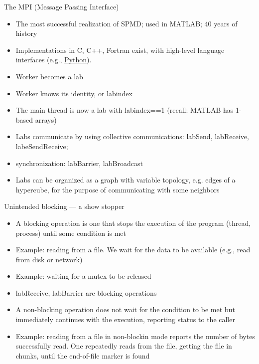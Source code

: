 \documentclass[pdflatex,colorlinks,landscape]{beamer}
\renewcommand\emph[1]{{\color{magenta}#1}}
\begin{document}
\begin{frame}{The MPI (Message Passing Interface)}
  \begin{itemize}
  \item The most successful realization of SPMD; used in MATLAB; 40 years of history 
  \item Implementations in C, C++, Fortran exist, with high-level
    language interfaces
    (e.g., \href{https://mpi4py.readthedocs.io/en/stable/}{Python}).
  \item Worker becomes a \emph{lab}
  \item Worker knows its identity, or \emph{labindex}
  \item The main thread is now a lab with \emph{labindex==1} (recall: MATLAB has 1-based arrays)
  \item Labs communicate by using \emph{collective communications}: labSend, labReceive, labeSendReceive;
  \item synchronization: labBarrier, labBroadcast
  \item Labs can be organized as a graph with variable topology, e.g. edges of a hypercube, for
    the purpose of communicating with some neighbors
  \end{itemize}
\end{frame}

\begin{frame}{Unintended blocking --- a show stopper}
  \begin{itemize}
  \item A \emph{blocking operation} is one that stops
    the execution of the program (thread, process)
    until some condition is met
  \item Example: reading from a file. We wait for the
    data to be available (e.g., read from disk or network)
  \item Example: waiting for a mutex to be released
  \item \emph{labReceive, labBarrier} are blocking operations
  \item A \emph{non-blocking operation} does not wait for the
    condition to be met but immediately continues with the
    execution, reporting status to the caller
  \item Example: reading from a file in non-blockin mode reports the number
    of bytes successfully read. One repeatedly reads
    from the file, getting the file in chunks, until the end-of-file marker
    is found
  \end{itemize}
\end{frame}
\end{document}
